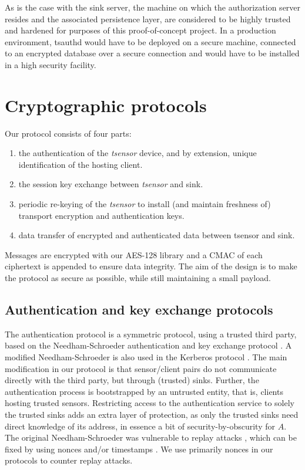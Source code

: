 As is the case with the sink server, the machine on which the authorization server resides and the associated persistence layer, are considered to be highly trusted and hardened for purposes of this proof-of-concept project. In a production environment, tsauthd would have to be deployed on a secure machine, connected to an encrypted database over a secure connection and would have to be installed in a high security facility.

\section{Cryptographic protocols}
\label{sec:cryptographic-protocols}

Our protocol consists of four parts:
%
\begin{enumerate}
\item the authentication of the \textit{tsensor} device, and by extension, unique identification of the hosting client.
\item the session key exchange between \textit{tsensor} and sink.
\item periodic re-keying of the \textit{tsensor} to install (and maintain freshness of) transport encryption and authentication keys.
\item data transfer of encrypted and authenticated data between tsensor and sink.
\end{enumerate} 
%
Messages are encrypted with our AES-128 library and a CMAC of each ciphertext is appended to ensure data integrity. The aim of the design is to make the protocol as secure as possible, while still maintaining a small payload.

\subsection{Authentication and key exchange protocols}
\label{sec:cryptographic-protocols-authentication}

The authentication protocol is a symmetric protocol, using a trusted third party, based on the Needham-Schroeder authentication and key exchange protocol . A modified Needham-Schroeder is also used in the Kerberos protocol . The main modification in our protocol is that sensor/client pairs do not communicate directly with the third party, but through (trusted) sinks. Further, the authentication process is bootstrapped by an untrusted entity, that is, clients hosting trusted sensors.
%
Restricting access to the authentication service to solely the trusted sinks adds an extra layer of protection, as only the trusted sinks need direct knowledge of its address, in essence a bit of security-by-obscurity for $A$.
%
The original Needham-Schroeder was vulnerable to replay attacks , which can be fixed by using nonces and/or timestamps \cite{needham1987}. We use primarily nonces in our protocols to counter replay attacks.


